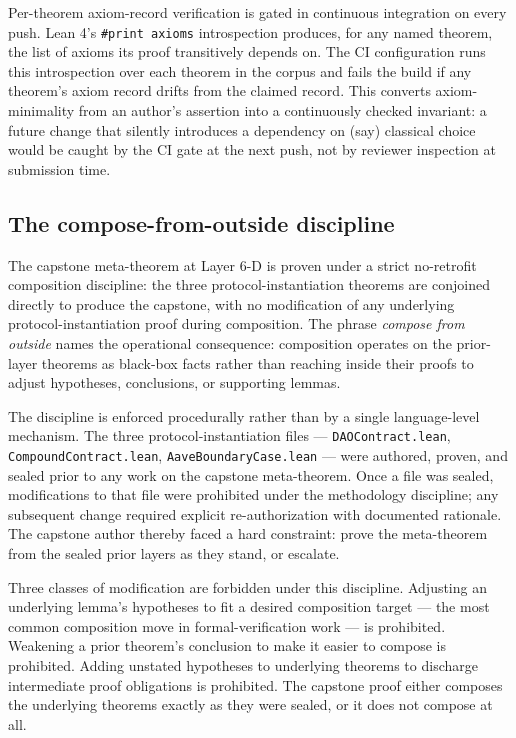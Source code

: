 Per-theorem axiom-record verification is gated in continuous integration
on every push. Lean 4's \texttt{\#print\ axioms} introspection produces,
for any named theorem, the list of axioms its proof transitively depends
on. The CI configuration runs this introspection over each theorem in
the corpus and fails the build if any theorem's axiom record drifts from
the claimed record. This converts axiom-minimality from an author's
assertion into a continuously checked invariant: a future change that
silently introduces a dependency on (say) classical choice would be
caught by the CI gate at the next push, not by reviewer inspection at
submission time.

\subsection{The compose-from-outside
discipline}\label{the-compose-from-outside-discipline}

The capstone meta-theorem at Layer 6-D is proven under a strict
no-retrofit composition discipline: the three protocol-instantiation
theorems are conjoined directly to produce the capstone, with no
modification of any underlying protocol-instantiation proof during
composition. The phrase \emph{compose from outside} names the
operational consequence: composition operates on the prior-layer
theorems as black-box facts rather than reaching inside their proofs to
adjust hypotheses, conclusions, or supporting lemmas.

The discipline is enforced procedurally rather than by a single
language-level mechanism. The three protocol-instantiation files ---
\texttt{DAOContract.lean}, \texttt{CompoundContract.lean},
\texttt{AaveBoundaryCase.lean} --- were authored, proven, and sealed
prior to any work on the capstone meta-theorem. Once a file was sealed,
modifications to that file were prohibited under the methodology
discipline; any subsequent change required explicit re-authorization
with documented rationale. The capstone author thereby faced a hard
constraint: prove the meta-theorem from the sealed prior layers as they
stand, or escalate.

Three classes of modification are forbidden under this discipline.
Adjusting an underlying lemma's hypotheses to fit a desired composition
target --- the most common composition move in formal-verification work
--- is prohibited. Weakening a prior theorem's conclusion to make it
easier to compose is prohibited. Adding unstated hypotheses to
underlying theorems to discharge intermediate proof obligations is
prohibited. The capstone proof either composes the underlying theorems
exactly as they were sealed, or it does not compose at all.

